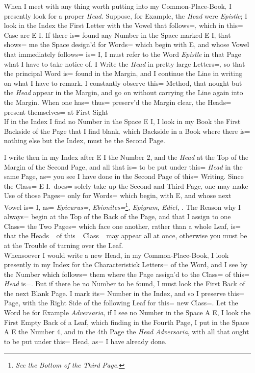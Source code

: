 When I meet with any thing worth putting into my Common-Place-Book,
I presently look for a proper \emph{Head}.
Suppose, for Example, the \emph{Head} were \emph{Epistle};
I look in the Index the First Letter with the Vowel that follows=,
which in this= Case are E I.
If there is= found any Number in the Space marked E I,
that shows= me the Space design'd for Words= which begin with E,
and whose Vowel that immediately follows= is= I,
I must refer to the Word \emph{Epistle} in that Page what I have to take notice of.
I Write the \emph{Head} in pretty large Letters=,
so that the principal Word is= found in the Margin,
and I continue the Line in writing on what I have to remark.
I constantly observe this= Method,
that nought but the \emph{Head} appear in the Margin,
and go on without carrying the Line again into the Margin.
When one has= thus= preserv'd the Margin clear,
the Heads= present themselves= at First Sight\\

If in the Index I find no Number in the Space E I,
I look in my Book the First Backside of the Page that I find blank,
which Backside in a Book where there is= nothing else but the Index,
must be the Second Page.

I write then in my Index after E I the Number 2,
and the \emph{Head}  at the Top of the Margin of the Second Page,
and all that is= to be put under this= \emph{Head} in the same Page,
as= you see I have done in the Second Page of this= Writing.
Since the Class= E I.\ does= solely take up the Second and Third Page,
one may make Use of those Pages= only for Words= which begin,
with E, and whose next Vowel is= I,
as= \emph{Epicurus=}, \emph{Ebionites=}\footnote{\emph{See the Bottom of the Third Page.}},
\emph{Epigram}, \emph{Edict}, \etc.
The Reason why I always= begin at the Top of the Back of the Page,
and that I assign to one Class= the Two Pages= which face one another,
rather than a whole Leaf, is= that the Heads= of this= Class= may appear all at once,
otherwise you must be at the Trouble of turning over the Leaf.\\

Whensoever I would write a new Head, in my Common-Place-Book,
I look presently in my Index for the Characteristick Letters= of the Word,
and I see by the Number which follows= them where the Page assign'd to the Class= of this= \emph{Head} is=.
But if there be no Number to be found, I must look the First Back of the next Blank Page.
I mark its= Number in the Index, and so I preserve this= Page,
with the Right Side of the following Leaf for this= new Class=.
Let the Word be for Example \emph{Adversaria}, if I see no Number in the Space A E,
I look the First Empty Back of a Leaf, which finding in the Fourth Page,
I put in the Space A E the Number 4, and in the 4th Page the \emph{Head} \emph{Adversaria},
with all that ought to be put under this= Head, as= I have already done.\\

